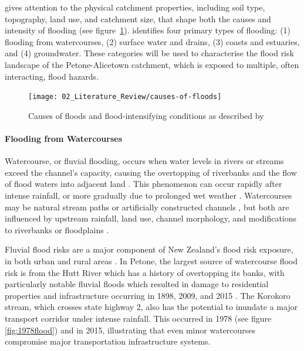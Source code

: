 \textcite{Ward1978} gives attention to the physical catchment properties,
including soil type, topography, land use, and catchment size, that shape both
the causes and intensity of flooding (see figure~\ref{fig:wardfloods}).
\textcite{White2013} identifies four primary types of flooding: (1) flooding
from watercourses, (2) surface water and drains, (3) coasts and estuaries, and
(4) groundwater. These categories will be used to characterise the flood risk
landscape of the Petone-Alicetown catchment, which is exposed to multiple, often
interacting, flood hazards.

\begin{figure}
  \centering
  \texttt{[image: 02\_Literature\_Review/causes-of-floods]}
  \caption{Causes of floods and flood-intensifying conditions as described by \textcite{Ward1978}}
  \label{fig:wardfloods}
\end{figure}

\paragraph{Flooding from Watercourses}
Watercourse, or fluvial flooding, occurs when water levels in rivers or streams
exceed the channel’s capacity, causing the overtopping of riverbanks and the
flow of flood waters into adjacent land \parencite{craig2021}. This phenomenon
can occur rapidly after intense rainfall, or more gradually due to prolonged wet
weather \parencite{smart2010}. Watercourses may be natural stream paths or
artificially constructed channels \parencite{Harding2015}, but both are
influenced by upstream rainfall, land use, channel morphology, and modifications
to riverbanks or floodplains \parencite{liu2022}.

Fluvial flood risks are a major component of New Zealand’s flood risk exposure,
in both urban and rural areas \parencite{hanna2025beyond, Fu2023}. In Petone,
the largest source of watercourse flood risk is from the Hutt River which has a
history of overtopping its banks, with particularly notable fluvial floods which
resulted in damage to residential properties and infrastructure occurring in
1898, 2009, and 2015 \parencite{ballinger2011potential, atapattu2015}. The
Korokoro stream, which crosses state highway 2, also has the potential to
inundate a major transport corridor under intense rainfall. This occurred in
1978 (see figure \ref{fig:1978flood}) and in 2015, illustrating that even minor
watercourses compromise major transportation infrastructure systems.


